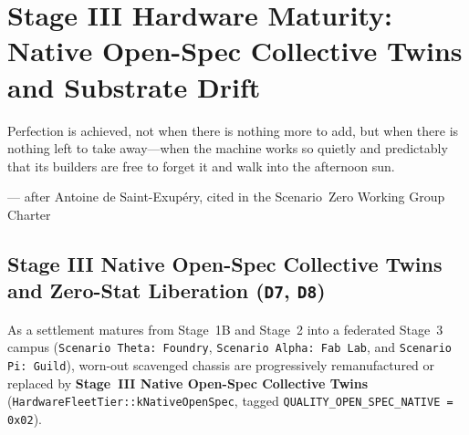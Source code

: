 \chapter{Stage III Hardware Maturity: Native Open-Spec Collective Twins and Substrate Drift}
\label{ch:stage3-open-spec-twins}

\epigraph{Perfection is achieved, not when there is nothing more to add, but when there is nothing left to take away---when the machine works so quietly and predictably that its builders are free to forget it and walk into the afternoon sun.}{--- after Antoine de Saint-Exup\'ery, cited in the Scenario~Zero Working Group Charter}

\section{Stage III Native Open-Spec Collective Twins and Zero-Stat Liberation (\texttt{D7}, \texttt{D8})}
\label{sec:l2-stage3-native-open-spec}

As a settlement matures from Stage~1B and Stage~2 into a federated Stage~3 campus (\texttt{Scenario Theta: Foundry}, \texttt{Scenario Alpha: Fab Lab}, and \texttt{Scenario Pi: Guild}), worn-out scavenged chassis are progressively remanufactured or replaced by \textbf{Stage~III Native Open-Spec Collective Twins} (\texttt{HardwareFleetTier::kNativeOpenSpec}, tagged \texttt{QUALITY\_OPEN\_SPEC\_NATIVE = 0x02}).

